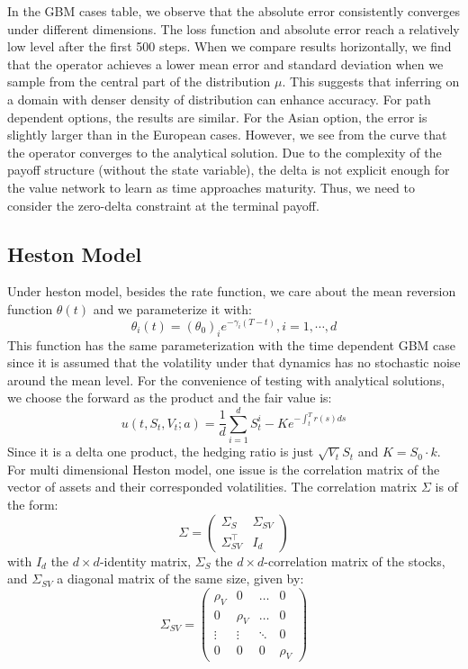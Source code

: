 \documentclass[11pt,a4paper]{article}
\theoremstyle{remark}
\begin{document}
	In the GBM cases table, we observe that the absolute error consistently converges under different dimensions. The loss function and absolute error reach a relatively low level after the first 500 steps. When we compare results horizontally, we find that the operator achieves a lower mean error and standard deviation when we sample from the central part of the distribution $\mu$. This suggests that inferring on a domain with denser density of distribution can enhance accuracy. For path dependent options, the results are similar. For the Asian option, the error is slightly larger than in the European cases. However, we see from the curve that the operator converges to the analytical solution. Due to the complexity of the payoff structure (without the state variable), the delta is not explicit enough for the value network to learn as time approaches maturity. Thus, we need to consider the zero-delta constraint at the terminal payoff.
	
	\subsection{Heston Model}
	Under heston model, besides the rate function, we care about the mean reversion function $\theta(t)$ and we parameterize it with:
	\begin{equation*}
		\theta_i(t) = (\theta_0)_i e^{-\gamma_i (T - t)}, i=1,\cdots,d
	\end{equation*}
	This function has the same parameterization with the time dependent GBM case since it is assumed that the volatility under that dynamics has no stochastic noise around the mean level.
	For the convenience of testing with analytical solutions, we choose the forward as the product and the fair value is:
	\begin{equation*}
		u(t, S_t, V_t;a) = \frac{1}{d}\sum_{i=1}^d S^i_t - K e^{-\int_t^T r(s)ds}
	\end{equation*}
	Since it is a delta one product, the hedging ratio is just $\sqrt{V_t}S_t$ and $K = S_0 \cdot k$.
	For multi dimensional Heston model, one issue is the correlation matrix of the vector of assets and their corresponded volatilities. The correlation matrix $\Sigma$ is of the form:
	\begin{equation*}
		\Sigma=\left(\begin{array}{cc}
			\Sigma_S & \Sigma_{S V} \\
			\Sigma_{S V}^{\top} & I_d
		\end{array}\right)
	\end{equation*}
	with $I_d$ the $d \times d$-identity matrix, $\Sigma_S$ the $d \times d$-correlation matrix of the stocks, and $\Sigma_{S V}$ a diagonal matrix of the same size, given by:
	\begin{equation*}
		\Sigma_{S V}=\left(\begin{array}{cccc}
			\rho_V & 0 & \ldots & 0 \\
			0 & \rho_V & \ldots & 0 \\
			\vdots & \vdots & \ddots & 0 \\
			0 & 0 & 0 & \rho_V
		\end{array}\right)
	\end{equation*}
	
\end{document}

